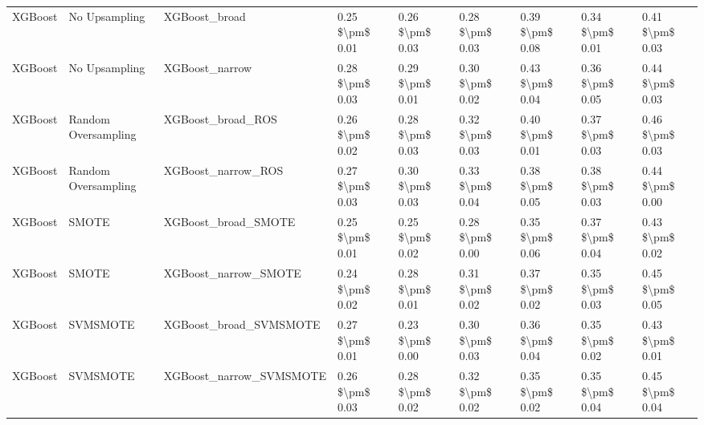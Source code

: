 \begin{tabular}{lllllllll}
                        XGBoost &                 No Upsampling &                                XGBoost\_broad & 0.25 \$\textbackslash pm\$ 0.01 &           0.26 \$\textbackslash pm\$ 0.03 &       0.28 \$\textbackslash pm\$ 0.03 &        0.39 \$\textbackslash pm\$ 0.08 &                         0.34 \$\textbackslash pm\$ 0.01 &     0.41 \$\textbackslash pm\$ 0.03 \\
                        XGBoost &                 No Upsampling &                               XGBoost\_narrow & 0.28 \$\textbackslash pm\$ 0.03 &           0.29 \$\textbackslash pm\$ 0.01 &       0.30 \$\textbackslash pm\$ 0.02 &        0.43 \$\textbackslash pm\$ 0.04 &                         0.36 \$\textbackslash pm\$ 0.05 &     0.44 \$\textbackslash pm\$ 0.03 \\
                        XGBoost &           Random Oversampling &                            XGBoost\_broad\_ROS & 0.26 \$\textbackslash pm\$ 0.02 &           0.28 \$\textbackslash pm\$ 0.03 &       0.32 \$\textbackslash pm\$ 0.03 &        0.40 \$\textbackslash pm\$ 0.01 &                         0.37 \$\textbackslash pm\$ 0.03 &     0.46 \$\textbackslash pm\$ 0.03 \\
                        XGBoost &           Random Oversampling &                           XGBoost\_narrow\_ROS & 0.27 \$\textbackslash pm\$ 0.03 &           0.30 \$\textbackslash pm\$ 0.03 &       0.33 \$\textbackslash pm\$ 0.04 &        0.38 \$\textbackslash pm\$ 0.05 &                         0.38 \$\textbackslash pm\$ 0.03 &     0.44 \$\textbackslash pm\$ 0.00 \\
                        XGBoost &                         SMOTE &                          XGBoost\_broad\_SMOTE & 0.25 \$\textbackslash pm\$ 0.01 &           0.25 \$\textbackslash pm\$ 0.02 &       0.28 \$\textbackslash pm\$ 0.00 &        0.35 \$\textbackslash pm\$ 0.06 &                         0.37 \$\textbackslash pm\$ 0.04 &     0.43 \$\textbackslash pm\$ 0.02 \\
                        XGBoost &                         SMOTE &                         XGBoost\_narrow\_SMOTE & 0.24 \$\textbackslash pm\$ 0.02 &           0.28 \$\textbackslash pm\$ 0.01 &       0.31 \$\textbackslash pm\$ 0.02 &        0.37 \$\textbackslash pm\$ 0.02 &                         0.35 \$\textbackslash pm\$ 0.03 &     0.45 \$\textbackslash pm\$ 0.05 \\
                        XGBoost &                      SVMSMOTE &                       XGBoost\_broad\_SVMSMOTE & 0.27 \$\textbackslash pm\$ 0.01 &           0.23 \$\textbackslash pm\$ 0.00 &       0.30 \$\textbackslash pm\$ 0.03 &        0.36 \$\textbackslash pm\$ 0.04 &                         0.35 \$\textbackslash pm\$ 0.02 &     0.43 \$\textbackslash pm\$ 0.01 \\
                        XGBoost &                      SVMSMOTE &                      XGBoost\_narrow\_SVMSMOTE & 0.26 \$\textbackslash pm\$ 0.03 &           0.28 \$\textbackslash pm\$ 0.02 &       0.32 \$\textbackslash pm\$ 0.02 &        0.35 \$\textbackslash pm\$ 0.02 &                         0.35 \$\textbackslash pm\$ 0.04 &     0.45 \$\textbackslash pm\$ 0.04 \\
\bottomrule
\end{tabular}

